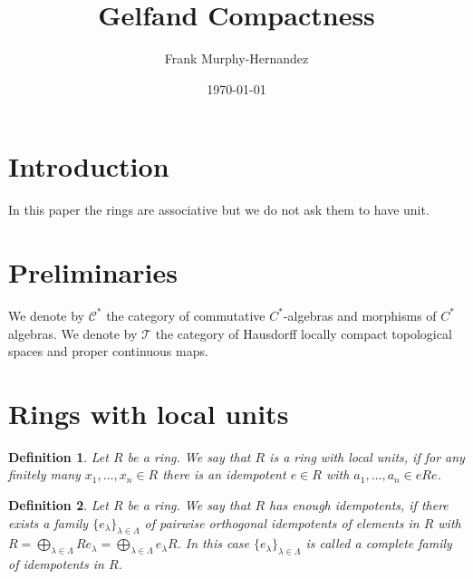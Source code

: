 \documentclass{amsart}
\newtheorem{definition}{Definition}[section]
\begin{document}
\title{Gelfand Compactness}

\author{Frank Murphy-Hernandez}
\address{Facultad de Ciencias, UNAM, Mexico City}


\date{\today}

\keywords{,,}

\begin{abstract}

\end{abstract}

\maketitle

\section*{Introduction}

In this paper the rings are associative but we do not ask them to have unit.



\section{Preliminaries}

\cite{wisbauer2018foundations}

We denote by $\mathcal{C}^*$ the category of commutative $C^*$-algebras and morphisms of $C^*$ algebras. We denote by $\mathcal{T}$ the category of Hausdorff locally compact topological spaces and proper continuous maps.


\section{Rings with local units}

\begin{definition}
Let $R$ be a ring. We say that $R$ is a ring with local units, if for any finitely many $x_1,\dots,x_n\in R$ there is an idempotent $e\in R$ with $a_1,\dots,a_n\in eRe$.
\end{definition}

\begin{definition}
Let $R$ be a ring. We say that $R$ has enough idempotents, if there exists a family $\{e_\lambda\}_{\lambda\in\Lambda}$ of pairwise orthogonal idempotents of elements in $R$ with $R=\bigoplus_{\lambda\in\Lambda}Re_\lambda=\bigoplus_{\lambda\in\Lambda}e_\lambda R$. In this case $\{e_\lambda\}_{\lambda\in\Lambda}$ is called a complete family of idempotents in $R$. 
\end{definition}
\end{document}

